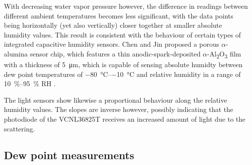 With decreasing water vapor pressure however, the difference in readings between different ambient temperatures becomes less significant, with the data points being horizontally (yet also vertically) closer together at smaller absolute humidity values. This result is consistent with the behaviour of certain types of integrated capacitive humidity sensors. Chen and Jin proposed a porous $\alpha$-alumina sensor chip, which features a thin anodic-spark-deposited $\alpha$-Al\textsubscript{2}O\textsubscript{3} film with a thickness of \qty{5}{\um}, which is capable of sensing absolute humidty between dew point temperatures of \qtyrange{-80}{-10}{\celsius} and relative humidity in a range of \qtyrange{10}{95}{\percent} RH \autocite{chenAlphaaluminaMoistureSensor1992}.

The light sensors show likewise a proportional behaviour along the relative humidity values. The slopes are inverse however, possibly indicating that the photodiode of the VCNL36825T receives an increased amount of light due to the scattering.


\subsection{Dew point measurements}

